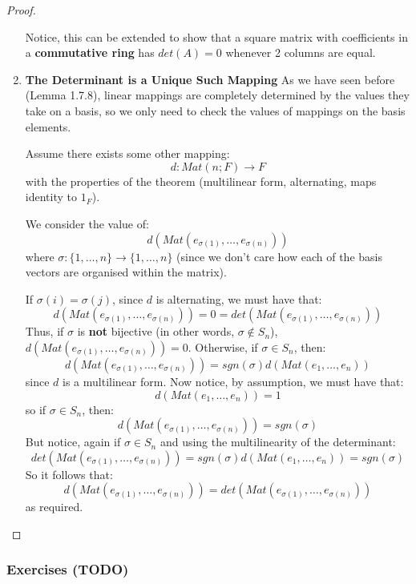 \documentclass{exam}
\begin{document}
\begin{proof}
\begin{enumerate}
    \bigskip
    
    Notice, this can be extended to show that a square matrix with coefficients in a \textbf{commutative ring} has $det(A) = 0$ whenever 2 columns are equal.
    \item \textbf{The Determinant is a Unique Such Mapping}
    As we have seen before (Lemma 1.7.8), linear mappings are completely determined by the values they take on a basis, so we only need to check the values of mappings on the basis elements.
    
    \bigskip
    
    Assume there exists some other mapping:
    \[
    d : Mat(n;F) \to F
    \]
    with the properties of the theorem (multilinear form, alternating, maps identity to $1_F$).
    
    \bigskip
    
    We consider the value of:
    \[
    d(Mat(e_{\sigma(1)}, \ldots, e_{\sigma(n)}))
    \]
    where $\sigma : \{1,\ldots,n\} \to \{1, \ldots, n\}$ (since we don't care how each of the basis vectors are organised within the matrix).
    
    \bigskip
    
    If $\sigma(i) = \sigma(j)$, since $d$ is alternating, we must have that:
    \[
    d(Mat(e_{\sigma(1)}, \ldots, e_{\sigma(n)})) = 0 = det(Mat(e_{\sigma(1)}, \ldots, e_{\sigma(n)}))
    \]
    Thus, if $\sigma$ is \textbf{not} bijective (in other words, $\sigma \not\in S_n$), $d(Mat(e_{\sigma(1)}, \ldots, e_{\sigma(n)})) = 0$. Otherwise, if $\sigma \in S_n$, then:
    \[
    d(Mat(e_{\sigma(1)}, \ldots, e_{\sigma(n)})) = sgn(\sigma)d(Mat(e_{1}, \ldots, e_{n}))
    \]
    since $d$ is a multilinear form. Now notice, by assumption, we must have that:
    \[
    d(Mat(e_{1}, \ldots, e_{n})) = 1
    \]
    so if $\sigma \in S_n$, then:
    \[
    d(Mat(e_{\sigma(1)}, \ldots, e_{\sigma(n)})) = sgn(\sigma)
    \]
    But notice, again if $\sigma \in S_n$ and using the multilinearity of the determinant:
    \[
    det(Mat(e_{\sigma(1)}, \ldots, e_{\sigma(n)})) = sgn(\sigma)d(Mat(e_{1}, \ldots, e_{n})) = sgn(\sigma)
    \]
    So it follows that:
    \[
    d(Mat(e_{\sigma(1)}, \ldots, e_{\sigma(n)})) = det(Mat(e_{\sigma(1)}, \ldots, e_{\sigma(n)}))
    \]
    as required.
\end{enumerate}

\end{proof}

\subsubsection{Exercises (TODO)}
\end{document}
